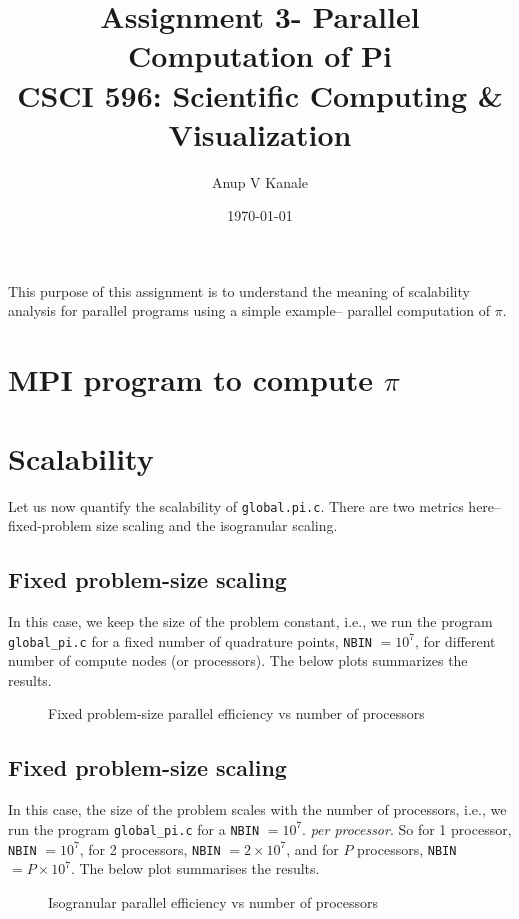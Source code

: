 \documentclass[11pt, oneside]{article}   	%
\title{\vspace{-6ex} Assignment 3- Parallel Computation of Pi \\ {CSCI 596: Scientific Computing \& Visualization}  \vspace{-2ex}}
\author{Anup V Kanale}
\date{\vspace{-2ex}\today}							%
\begin{document}
\maketitle \vspace{-5ex}

This purpose of this assignment is to understand the meaning of scalability analysis for parallel programs using a simple example-- parallel computation of $\pi$.
\vspace{-2ex} \section{MPI program to compute $\pi$}


\vspace{-2ex} \section{Scalability}
Let us now quantify the scalability of \texttt{global.pi.c}. There are two metrics here-- fixed-problem size scaling and the isogranular scaling.

\subsection{Fixed problem-size scaling}
In this case, we keep the size of the problem constant, i.e., we run the program \texttt{global\_pi.c} for a fixed number of quadrature points, \texttt{NBIN} $= 10^7$, for different number of compute nodes (or processors). The below plots summarizes the results.
	\begin{figure}[!htbp] \label{fig:fixed}
		\centering
		\caption{Fixed problem-size parallel efficiency vs number of processors}
	\end{figure}

\subsection{Fixed problem-size scaling}
In this case, the size of the problem scales with the number of processors, i.e., we run the program \texttt{global\_pi.c} for a \texttt{NBIN} $= 10^7$. \textit{per processor}. So for 1 processor, \texttt{NBIN} $= 10^7$, for 2 processors, \texttt{NBIN} $= 2 \times10^7$, and for $P$ processors,  \texttt{NBIN} $= P \times10^7$. The below plot summarises the results.
	\begin{figure}[!htbp] \label{fig:isogranular}
		\centering
		\caption{Isogranular parallel efficiency vs number of processors}
	\end{figure}
\end{document}
